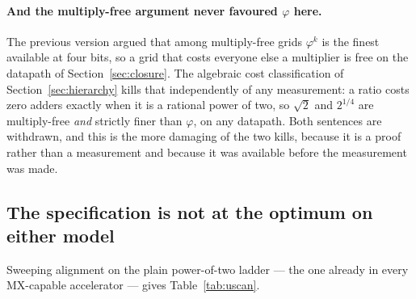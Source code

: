 \documentclass[11pt]{article}
\theoremstyle{definition}
\begin{document}
\paragraph{And the multiply-free argument never favoured $\varphi$ here.} The
previous version argued that among multiply-free grids $\varphi^{k}$ is the
finest available at four bits, so a grid that costs everyone else a multiplier
is free on the datapath of Section~\ref{sec:closure}. The algebraic cost
classification of Section~\ref{sec:hierarchy} kills that independently of any
measurement: a ratio costs zero adders exactly when it is a rational power of
two, so $\sqrt2$ and $2^{1/4}$ are multiply-free \emph{and} strictly finer than
$\varphi$, on any datapath. Both sentences are withdrawn, and this is the more
damaging of the two kills, because it is a proof rather than a measurement and
because it was available before the measurement was made.

\subsection{The specification is not at the optimum on either model}
\label{sec:cliff}

Sweeping alignment on the plain power-of-two ladder --- the one already in every
MX-capable accelerator --- gives Table~\ref{tab:uscan}.
\end{document}
